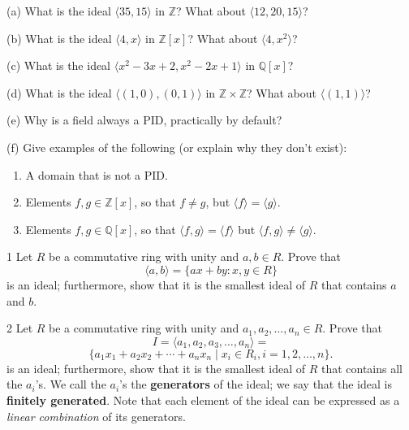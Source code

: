 \begin{problem}[Warmup]{(a)}
    What is the ideal $\langle 35, 15 \rangle$ in $\mathbb{Z}$? What about $\langle 12, 20, 15 \rangle$?
\end{problem}
\unsolved

\begin{problem}[Warmup]{(b)}
    What is the ideal $\langle 4, x \rangle$ in $\mathbb{Z}[x]$? What about $\langle 4, x^2 \rangle$?
\end{problem}
\unsolved

\begin{problem}[Warmup]{(c)}
    What is the ideal $\langle x^2 - 3x + 2, x^2 - 2x + 1 \rangle$ in $\mathbb{Q}[x]$?
\end{problem}
\unsolved

\begin{problem}[Warmup]{(d)}
    What is the ideal $\langle (1, 0), (0, 1) \rangle$ in $\mathbb{Z} \times \mathbb{Z}$? What about $\langle (1, 1) \rangle$?
\end{problem}
\unsolved

\begin{problem}[Warmup]{(e)}
    Why is a field always a PID, practically by default?
\end{problem}
\unsolved

\begin{problem}[Warmup]{(f)}
    Give examples of the following (or explain why they don't exist):
    \begin{enumerate}
        \item[(a)] A domain that is not a PID.
        \item[(b)] Elements $f, g \in \mathbb{Z}[x]$, so that $f \neq g$, but $\langle f \rangle = \langle g \rangle$.
        \item[(c)] Elements $f, g \in \mathbb{Q}[x]$, so that $\langle f, g \rangle = \langle f \rangle$ but $\langle f, g \rangle \neq \langle g \rangle$.
    \end{enumerate}
\end{problem}
\unsolved

\begin{problem}{1}
    Let $R$ be a commutative ring with unity and $a, b \in R$. Prove that
    \[\langle a, b \rangle = \{ax + by : x, y \in R\}\]
    is an ideal; furthermore, show that it is the smallest ideal of $R$ that contains
    $a$ and $b$.
\end{problem}
\unsolved

\begin{problem}{2}
    Let $R$ be a commutative ring with unity and $a_1, a_2, \ldots, a_n \in R$.
    Prove that 
    \[I = \langle a_1, a_2, a_3, \ldots, a_n \rangle = \]
    \[\{a_1 x_1 + a_2 x_2 + \cdots + a_n x_n \mid x_i \in R_i, i = 1, 2, \ldots, n\}.\]
    is an ideal; furthermore, show that it is the smallest ideal of $R$ 
    that contains all the $a_i$'s. We call the $a_i$'s the \textbf{generators}
    of the ideal; we say that the ideal is \textbf{finitely generated}.
    Note that each element of the ideal can be expressed as a \emph{linear combination}
    of its generators.
\end{problem}
\solved

